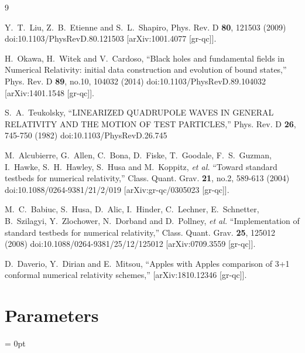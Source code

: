 \begin{thebibliography}{9}

Y.~T.~Liu, Z.~B.~Etienne and S.~L.~Shapiro,
Phys. Rev. D \textbf{80}, 121503 (2009)
doi:10.1103/PhysRevD.80.121503
[arXiv:1001.4077 [gr-qc]].

H.~Okawa, H.~Witek and V.~Cardoso,
``Black holes and fundamental fields in Numerical Relativity: initial data construction and evolution of bound states,''
Phys. Rev. D \textbf{89}, no.10, 104032 (2014)
doi:10.1103/PhysRevD.89.104032
[arXiv:1401.1548 [gr-qc]].

S.~A.~Teukolsky,
``LINEARIZED QUADRUPOLE WAVES IN GENERAL RELATIVITY AND THE MOTION OF TEST PARTICLES,''
Phys. Rev. D \textbf{26}, 745-750 (1982)
doi:10.1103/PhysRevD.26.745

M.~Alcubierre, G.~Allen, C.~Bona, D.~Fiske, T.~Goodale, F.~S.~Guzman, I.~Hawke, S.~H.~Hawley, S.~Husa and M.~Koppitz, \textit{et al.}
``Toward standard testbeds for numerical relativity,''
Class. Quant. Grav. \textbf{21}, no.2, 589-613 (2004)
doi:10.1088/0264-9381/21/2/019
[arXiv:gr-qc/0305023 [gr-qc]].

M.~C.~Babiuc, S.~Husa, D.~Alic, I.~Hinder, C.~Lechner, E.~Schnetter, B.~Szilagyi, Y.~Zlochower, N.~Dorband and D.~Pollney, \textit{et al.}
``Implementation of standard testbeds for numerical relativity,''
Class. Quant. Grav. \textbf{25}, 125012 (2008)
doi:10.1088/0264-9381/25/12/125012
[arXiv:0709.3559 [gr-qc]].

D.~Daverio, Y.~Dirian and E.~Mitsou,
``Apples with Apples comparison of 3+1 conformal numerical relativity schemes,''
[arXiv:1810.12346 [gr-qc]].

\end{thebibliography}




\section{Parameters} 


\parskip = 0pt

\setlength{\tableWidth}{160mm}

\setlength{\paraWidth}{\tableWidth}
\setlength{\descWidth}{\tableWidth}
\settowidth{\maxVarWidth}{schedule\_in\_admbasex\_initialdata}

